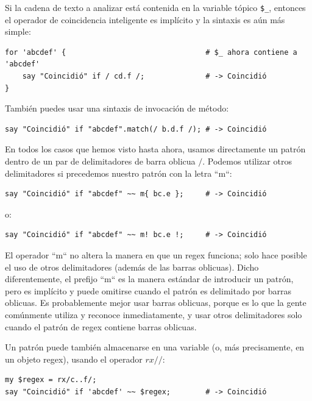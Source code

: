 Si la cadena de texto a analizar está contenida en la 
variable tópico \verb|$_|, entonces el operador de coincidencia
inteligente es implícito y la sintaxis es aún más simple:

\begin{verbatim}
for 'abcdef' {                                # $_ ahora contiene a 'abcdef'
    say "Coincidió" if / cd.f /;              # -> Coincidió
}
\end{verbatim}
%

También puedes usar una sintaxis de invocación de método:
\begin{verbatim}
say "Coincidió" if "abcdef".match(/ b.d.f /); # -> Coincidió
\end{verbatim}
%

En todos los casos que hemos visto hasta ahora, usamos 
directamente un patrón dentro de un par de delimitadores de barra
oblicua $/$. Podemos utilizar otros delimitadores si precedemos
nuestro patrón con la letra ``m``:

\begin{verbatim}
say "Coincidió" if "abcdef" ~~ m{ bc.e };     # -> Coincidió
\end{verbatim}
%

o:
\begin{verbatim}
say "Coincidió" if "abcdef" ~~ m! bc.e !;     # -> Coincidió
\end{verbatim}
%

El operador ``m`` no altera la manera en que un regex funciona;
solo hace posible el uso de otros delimitadores (además de las
barras oblicuas). Dicho diferentemente, el prefijo ``m`` es la
manera estándar de introducir un patrón, pero es implícito y 
puede omitirse cuando el patrón es delimitado por barras oblicuas.
Es probablemente mejor usar barras oblicuas, porque es lo que la
gente comúnmente utiliza y reconoce inmediatamente, y usar otros
delimitadores solo cuando el patrón de regex contiene barras
oblicuas.

Un patrón puede también almacenarse en una variable (o, más
precisamente, en un objeto regex), usando el operador $rx//$:

\begin{verbatim}
my $regex = rx/c..f/;
say "Coincidió" if 'abcdef' ~~ $regex;        # -> Coincidió
\end{verbatim}
%


